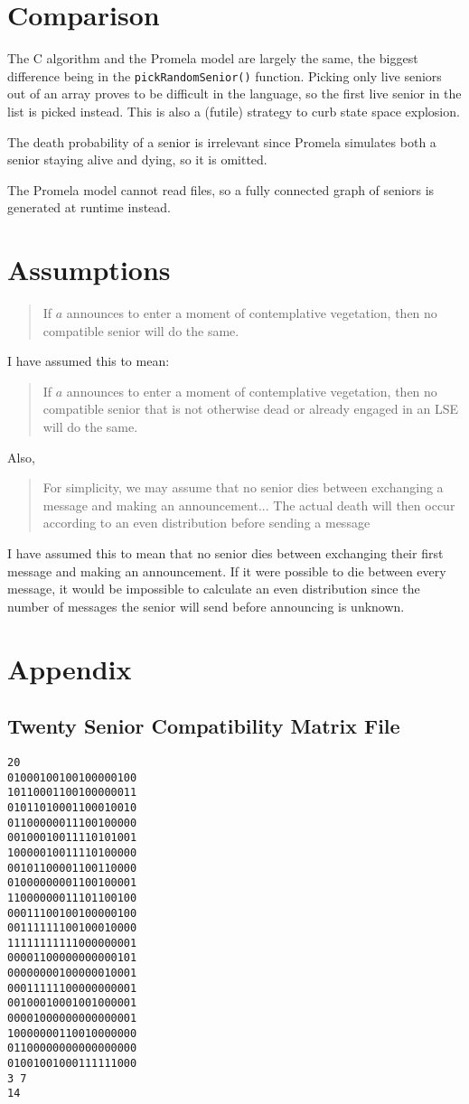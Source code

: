 \documentclass[a4paper]{article}
\begin{document}
\section{Comparison}
The C algorithm and the Promela model are largely the same, the biggest difference being in the \texttt{pickRandomSenior()} function. Picking only live seniors out of an array proves to be difficult in the language, so the first live senior in the list is picked instead. This is also a (futile) strategy to curb state space explosion.

The death probability of a senior is irrelevant since Promela simulates both a senior staying alive and dying, so it is omitted. 

The Promela model cannot read files, so a fully connected graph of seniors is generated at runtime instead.

\section{Assumptions}
\begin{quote}
If $a$ announces to enter a moment of contemplative vegetation, then no compatible senior will do the same.
\end{quote}
I have assumed this to mean:
\begin{quote}
If $a$ announces to enter a moment of contemplative vegetation, then no compatible senior that is not otherwise dead or already engaged in an LSE will do the same.
\end{quote}
Also,
\begin{quote}
For simplicity, we may assume that no senior dies between exchanging a message and making an announcement... The actual death will then occur according to an even distribution before sending a message
\end{quote}
I have assumed this to mean that no senior dies between exchanging their first message and making an announcement. If it were possible to die between every message, it would be impossible to calculate an even distribution since the number of messages the senior will send before announcing is unknown.

\section{Appendix}
\subsection{Twenty Senior Compatibility Matrix File}
\begin{verbatim}
20
01000100100100000100
10110001100100000011
01011010001100010010
01100000011100100000
00100010011110101001
10000010011110100000
00101100001100110000
01000000001100100001
11000000011101100100
00011100100100000100
00111111100100010000
11111111111000000001
00001100000000000101
00000000100000010001
00011111100000000001
00100010001001000001
00001000000000000001
10000000110010000000
01100000000000000000
01001001000111111000
3 7
14
\end{verbatim}
\end{document}
